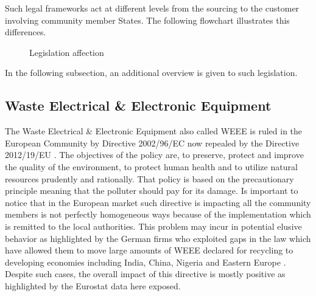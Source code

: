 \documentclass{article}
\begin{document}
  Such legal frameworks act at different levels from the sourcing to the customer involving community member States. The following flowchart illustrates this differences.

  \begin{figure}
    \centering

    \caption{Legislation affection}
  \end{figure}

  In the following subsection, an additional overview is given to such legislation.

\subsection{Waste Electrical \& Electronic Equipment}
  The Waste Electrical \& Electronic Equipment also called WEEE is ruled in the European Community by Directive 2002/96/EC now repealed by the Directive 2012/19/EU . The objectives of the policy are, to preserve, protect and improve the quality of the environment, to protect human health and to utilize natural resources prudently and rationally. That policy is based on the precautionary principle meaning that the polluter should pay for its damage. Is important to notice that in the European market such directive is impacting all the community members is not perfectly homogeneous ways because of the implementation which is remitted to the local authorities. This problem may incur in potential elusive behavior as highlighted by the German firms who exploited gaps in the law which have allowed them to move large amounts of WEEE declared for recycling to developing economies including India, China, Nigeria and Eastern Europe \cite{ongondo_how_2011}. Despite such cases, the overall impact of this directive is mostly positive as highlighted by the Eurostat data here exposed.
\end{document}
